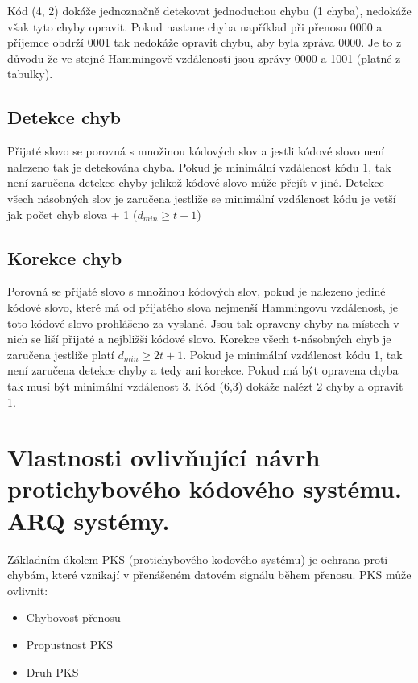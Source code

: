 Kód (4, 2) dokáže jednoznačně detekovat jednoduchou chybu (1 chyba), nedokáže však tyto chyby opravit.
Pokud nastane chyba například při přenosu 0000 a příjemce obdrží 0001 tak nedokáže opravit chybu, aby byla zpráva 0000.
Je to z důvodu že ve stejné Hammingově vzdálenosti jsou zprávy 0000 a 1001 (platné z tabulky).

\subsection{Detekce chyb}

Přijaté slovo se porovná s množinou kódových slov a jestli kódové slovo není nalezeno tak je detekována chyba.
Pokud je minimální vzdálenost kódu 1, tak není zaručena detekce chyby jelikož kódové slovo může přejít v jiné.
Detekce všech násobných slov je zaručena jestliže se minimální vzdálenost kódu je vetší jak počet chyb slova + 1 ($d_{min}\ge t + 1$)

\subsection{Korekce chyb}

Porovná se přijaté slovo s množinou kódových slov, pokud je nalezeno jediné kódové slovo, které má od přijatého slova nejmenší Hammingovu vzdálenost, je toto kódové slovo prohlášeno za vyslané.
Jsou tak opraveny chyby na místech v nich se liší přijaté a nejbližší kódové slovo.
Korekce všech t-násobných chyb je zaručena jestliže platí $d_{min}\ge 2t + 1$.
Pokud je minimální vzdálenost kódu 1, tak není zaručena detekce chyby a tedy ani korekce.
Pokud má být opravena chyba tak musí být minimální vzdálenost 3.
Kód (6,3) dokáže nalézt 2 chyby a opravit 1.


\clearpage
\section{Vlastnosti ovlivňující návrh protichybového kódového systému. ARQ systémy.}

Základním úkolem PKS (protichybového kodového systému) je ochrana proti chybám, které vznikají v přenášeném datovém signálu během přenosu.
PKS může ovlivnit:
\begin{itemize}[noitemsep]
    \item Chybovost přenosu
    \item Propustnost PKS
    \item Druh PKS
\end{itemize}

